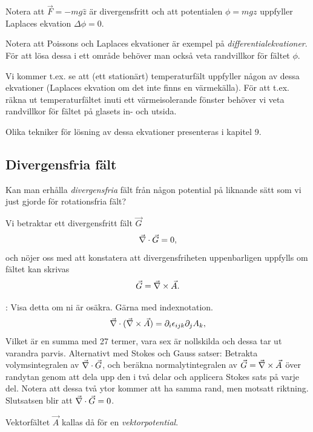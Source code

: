 \documentclass[%
oneside,                 %
final,                   %
10pt]{article}
\newcommand{\longinlinecomment}[3]{{\color{red}{\bf #1}: #2}}
\newenvironment{warning_mdfboxadmon}[1][]{
\begin{warning_mdfboxmdframed}[frametitle=#1]
}
{
\end{warning_mdfboxmdframed}
}
\begin{document}
\begin{warning_mdfboxadmon}[Kommentar]
Notera att $\vec{F} = -m g \hat{z}$ är divergensfritt och att potentialen $\phi = m g z$ uppfyller Laplaces ekvation $\Delta \phi = 0$.
\end{warning_mdfboxadmon} %



Notera att Poissons och Laplaces ekvationer är exempel på \emph{differentialekvationer}. För att lösa dessa i ett område behöver man också veta randvillkor för fältet $\phi$. 

Vi kommer t.ex. se att (ett stationärt) temperaturfält uppfyller någon av dessa ekvationer (Laplaces ekvation om det inte finns en värmekälla). För att t.ex. räkna ut temperaturfältet inuti ett värmeisolerande fönster behöver vi veta randvillkor för fältet på glasets in- och utsida.

Olika tekniker för lösning av dessa ekvationer presenteras i kapitel 9.

\subsection*{Divergensfria fält}

Kan man erhålla \emph{divergensfria} fält från någon potential på liknande sätt som vi just gjorde för rotationsfria fält?

Vi betraktar ett divergensfritt fält $\vec{G}$
$$
\vec{\nabla} \cdot \vec{G} = 0,
$$
och nöjer oss med att konstatera att divergensfriheten uppenbarligen uppfylls om fältet kan skrivas
\begin{equation}
\vec{G} = \vec{\nabla} \times \vec{A}.
\end{equation}

\longinlinecomment{Kommentar 2}{ Visa detta om ni är osäkra.   Gärna med indexnotation. $$ \vec{\nabla} \cdot (\vec{\nabla} \times \vec{A}) = \partial_i \epsilon_{ijk} \partial_j A_k, $$ Vilket är en summa med 27 termer, vara sex är nollskilda och dessa tar ut varandra parvis.  Alternativt med Stokes och Gauss satser: Betrakta volymsintegralen av $\vec{\nabla} \cdot \vec{G}$, och beräkna normalytintegralen av $\vec{G} = \vec{\nabla} \times \vec{A}$ över randytan genom att dela upp den i två delar och applicera Stokes sats på varje del. Notera att dessa två ytor kommer att ha samma rand, men motsatt riktning. Slutsatsen blir att $\vec{\nabla} \cdot \vec{G} = 0$. }{ Visa detta om ni }

Vektorfältet $\vec{A}$ kallas då för en \emph{vektorpotential}.
\end{document}
